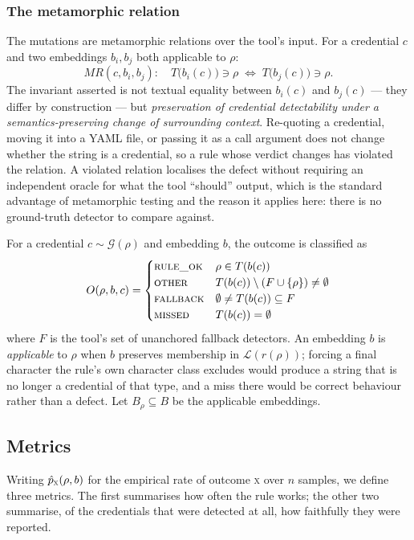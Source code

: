 \documentclass[journal]{IEEEtran}
\begin{document}
\subsubsection*{The metamorphic relation}
\label{sec:mr}

The mutations are metamorphic relations over the tool's input. For a credential $c$ and two embeddings $b_i, b_j$ both applicable to $\rho$:
\[
\mathit{MR}(c, b_i, b_j):\quad
T\bigl(b_i(c)\bigr) \ni \rho \;\Longleftrightarrow\; T\bigl(b_j(c)\bigr) \ni \rho .
\]
The invariant asserted is not textual equality between $b_i(c)$ and $b_j(c)$ --- they differ by construction --- but \emph{preservation of credential detectability under a semantics-preserving change of surrounding context}. Re-quoting a credential, moving it into a YAML file, or passing it as a call argument does not change whether the string is a credential, so a rule whose verdict changes has violated the relation. A violated relation localises the defect without requiring an independent oracle for what the tool ``should'' output, which is the standard advantage of metamorphic testing and the reason it applies here: there is no ground-truth detector to compare against.

For a credential $c \sim \mathcal{G}(\rho)$ and embedding $b$, the outcome is classified as
\[
O(\rho,b,c)=
\begin{cases}
\textsc{rule\_ok} & \rho \in T(b(c))\\
\textsc{other} & T(b(c)) \setminus (F \cup \{\rho\}) \neq \emptyset\\
\textsc{fallback} & \emptyset \neq T(b(c)) \subseteq F\\
\textsc{missed} & T(b(c)) = \emptyset
\end{cases}
\]
where $F$ is the tool's set of unanchored fallback detectors. An embedding $b$ is \emph{applicable} to $\rho$ when $b$ preserves membership in $\mathcal{L}(r(\rho))$; forcing a final character the rule's own character class excludes would produce a string that is no longer a credential of that type, and a miss there would be correct behaviour rather than a defect. Let $B_\rho \subseteq B$ be the applicable embeddings.

\subsection{Metrics}
\label{sec:metrics}

Writing $\hat p_{\textsc{x}}(\rho,b)$ for the empirical rate of outcome \textsc{x} over $n$ samples, we define three metrics. The first summarises how often the rule works; the other two summarise, of the credentials that were detected at all, how faithfully they were reported.
\end{document}
